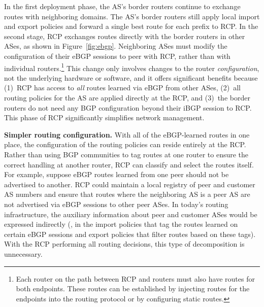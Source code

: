 In the first deployment phase, the AS's border routers continue to
exchange routes with neighboring domains.  The AS's border routers still apply
local import and export policies and forward a single best route for
each prefix to RCP.  In the second stage, RCP exchanges routes
directly with the border routers in other ASes, as shown in
Figure~\ref{fig:ebgp}.  Neighboring ASes must modify the
configuration of their eBGP sessions to peer with RCP, rather than
with individual routers.\footnote{Each router on the path
  between RCP and routers must also have routes for both endpoints.
These routes can be established by injecting routes for the endpoints
into the routing protocol or by configuring static routes.}
This change only involves changes to the router {\em configuration}, not the
underlying hardware or software, and it
offers significant benefits because (1)~RCP has access to {\em all\/}
routes learned via eBGP from other ASes, (2)~all routing policies
for the AS are applied directly at the RCP, and (3)~the border routers do
not need any BGP configuration beyond their iBGP session to RCP. 
This phase of RCP significantly simplifies network management.

{\bf Simpler routing configuration.}  With all of the eBGP-learned
routes in one place, the configuration of the routing policies can
reside entirely at the RCP.  Rather than using BGP communities to tag
routes at one router to ensure the correct handling at another router,
RCP can classify and select the routes itself.  For example, suppose
eBGP routes learned from one peer should not be advertised to another.
RCP could maintain a local registry of peer and customer AS
numbers and ensure that routes where the neighboring AS is a peer AS
are not advertised via eBGP sessions to other peer ASes.  In today's
routing infrastructure, the auxiliary information about peer and
customer ASes would be expressed indirectly (\ie, in the import
policies that tag the routes learned on certain eBGP sessions and
export policies that filter routes based on these tags).  With the RCP
performing all routing decisions, this type of decomposition is unnecessary.

